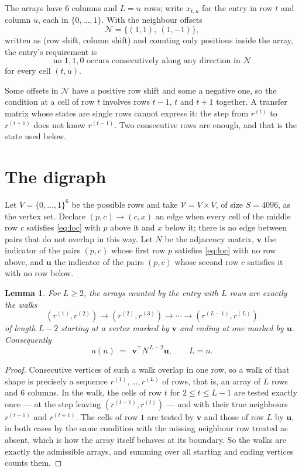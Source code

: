 \documentclass[11pt,a4paper]{article}
\theoremstyle{plain}
\newtheorem{lemma}[theorem]{Lemma}
\theoremstyle{definition}
\begin{document}
The arrays have $6$ columns and $L=n$ rows; write $x_{t,u}$ for the entry in
row $t$ and column $u$, each in $\{0,\dots,1\}$. With the neighbour offsets
\[
\mathcal N=\{(1,1),\ (1,-1)\},
\]
written as (row shift, column shift) and counting only positions inside the array, the
entry's requirement is
\begin{equation}\label{eq:loc}
\text{no }1,1,0\text{ occurs consecutively along any direction in }\mathcal N
\end{equation}
for every cell $(t,u)$.

Some offsets in $\mathcal N$ have a positive row shift and some a negative one, so the
condition at a cell of row $t$ involves rows $t-1$, $t$ and $t+1$ together. A transfer
matrix whose states are single rows cannot express it: the step from $r^{(t)}$ to
$r^{(t+1)}$ does not know $r^{(t-1)}$. Two consecutive rows are enough, and that is
the state used below.

\section{The digraph}

Let $V=\{0,\dots,1\}^{6}$ be the possible rows and take
$\mathcal V=V\times V$, of size $S=4096$, as the vertex set. Declare $(p,c)\to(c,x)$ an edge
when every cell of the middle row $c$ satisfies \eqref{eq:loc} with $p$ above it and $x$
below it; there is no edge between pairs that do not overlap in this way. Let $N$ be the
adjacency matrix, $\mathbf{v}$ the indicator of the pairs $(p,c)$ whose first row $p$
satisfies \eqref{eq:loc} with no row above, and $\mathbf{u}$ the indicator of
the pairs $(p,c)$ whose second row $c$ satisfies it with no row below.

\begin{lemma}\label{lem:walk}
For $L\ge2$, the arrays counted by the entry with $L$ rows are exactly the walks
\[
(r^{(1)},r^{(2)})\to(r^{(2)},r^{(3)})\to\cdots\to(r^{(L-1)},r^{(L)})
\]
of length $L-2$ starting at a vertex marked by $\mathbf{v}$ and ending at one marked by
$\mathbf{u}$. Consequently
\[
a(n)\;=\;\,\mathbf{v}^{\!\top}N^{\,L-2}\mathbf{u},\qquad L=n .
\]
\end{lemma}

\begin{proof}
Consecutive vertices of such a walk overlap in one row, so a walk of that shape is
precisely a sequence $r^{(1)},\dots,r^{(L)}$ of rows, that is, an array of $L$ rows
and $6$ columns. In the walk, the cells of row $t$ for $2\le t\le L-1$ are tested
exactly once --- at the step leaving $(r^{(t-1)},r^{(t)})$ --- and with their true
neighbours $r^{(t-1)}$ and $r^{(t+1)}$. The cells of row $1$ are tested by
$\mathbf{v}$ and those of row $L$ by $\mathbf{u}$, in both cases by the same condition
with the missing neighbour row treated as absent, which is how the array itself behaves at
its boundary. So the walks are exactly the admissible arrays, and summing over all starting
and ending vertices counts them.
\end{proof}
\end{document}
